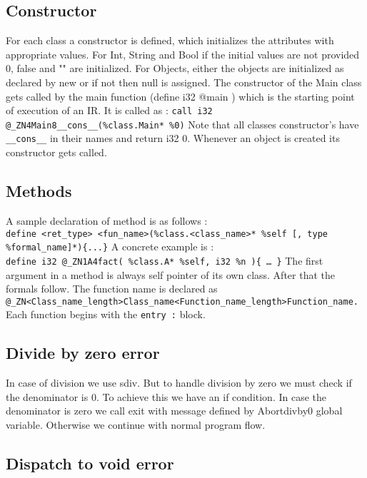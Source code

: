 \documentclass{article}
\begin{document}
\subsection{Constructor}

For each class a constructor is defined, which initializes the attributes with appropriate values. For Int, String and Bool if the initial values are not provided 0, false and "" are initialized. For Objects, either the objects are initialized as declared by new or if not then null is assigned. The constructor of the Main class gets called by the main function (define i32 @main ) which is the starting point of execution of an IR. It is called as :
\verb|call i32 @_ZN4Main8__cons__(%class.Main* %0)|
Note that all classes constructor’s have \verb|__cons__| in their names and return i32 0. Whenever an object is created its constructor gets called.

\subsection{Methods}

A sample declaration of method is as follows :\\
\verb|define <ret_type> <fun_name>(%class.<class_name>* %self [, type %formal_name]*){...}|
A concrete example is :\\
\verb|define i32 @_ZN1A4fact( %class.A* %self, i32 %n ){ … }|
The first argument in a method is always self pointer of its own class. After that the formals follow. The function name is declared as\\
\verb|@_ZN<Class_name_length>Class_name<Function_name_length>Function_name.|
Each function begins with the \verb|entry :| block.

\subsection{Divide by zero error}

In case of division we use sdiv. But to handle division by zero we must check if the denominator is 0. To achieve this we have an if condition. In case the denominator is zero we call exit with message defined by Abortdivby0 global variable. Otherwise we continue with normal program flow.

\subsection{Dispatch to void error}
\end{document}
